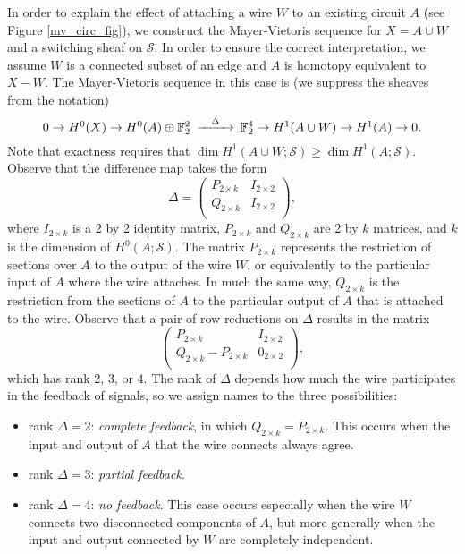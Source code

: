 \documentclass{amsart}
\theoremstyle{plain}
\theoremstyle{definition}
\begin{document}
In order to explain the effect of attaching a wire $W$ to an existing
circuit $A$ (see Figure \ref{mv_circ_fig}), we construct the
Mayer-Vietoris sequence for $X=A\cup W$ and a switching sheaf on
$\mathcal{S}$.  In order to ensure the correct interpretation, we
assume $W$ is a connected subset of an edge and $A$ is homotopy
equivalent to $X-W$.  The Mayer-Vietoris sequence in this case is (we
suppress the sheaves from the notation)
\begin{equation*}
\begin{CD}
0 \to H^0(X) \to H^0(A)\oplus \mathbb{F}_2^2 @>\Delta>> \mathbb{F}_2^4
\to H^1(A\cup W) \to H^1(A) \to 0.
\end{CD}
\end{equation*}
Note that exactness requires that $\dim H^1(A\cup W;\mathcal{S})
\ge \dim H^1(A; \mathcal{S})$.  Observe that the difference map takes the form
\begin{equation*}
\Delta=\begin{pmatrix}
P_{2 \times k} & I_{2\times 2}\\
Q_{2 \times k} & I_{2\times 2}\\
\end{pmatrix},
\end{equation*}
where $I_{2 \times k}$ is a 2 by 2 identity matrix, $P_{2 \times k}$ and $Q_{2 \times k}$ are 2 by $k$ matrices, and $k$ is the dimension of $H^0(A;\mathcal{S})$.  The matrix $P_{2 \times k}$ represents the restriction of sections over $A$ to the output of the wire $W$, or equivalently to the particular input of $A$ where the wire attaches.  In much the same way, $Q_{2 \times k}$ is the restriction from the sections of $A$ to the particular output of $A$ that is attached to the wire.  Observe that a pair of row reductions on $\Delta$ results in the matrix
\begin{equation*}
\begin{pmatrix}
P_{2 \times k} & I_{2\times 2}\\
Q_{2 \times k}-P_{2 \times k} & 0_{2\times 2}\\
\end{pmatrix},
\end{equation*}
which has rank 2, 3, or 4.  The rank of $\Delta$ depends how much the wire participates in the feedback of signals, so we assign names to the three possibilities:
\begin{itemize}
\item rank $\Delta=2$: {\it complete feedback}, in which $Q_{2 \times k}=P_{2 \times k}$.  This occurs when the input and output of $A$ that the wire connects always agree.
\item rank $\Delta=3$: {\it partial feedback}.
\item rank $\Delta=4$: {\it no feedback}.  This case occurs especially when the wire $W$ connects two disconnected components of $A$, but more generally when the input and output connected by $W$ are completely independent.
\end{itemize}
\end{document}
